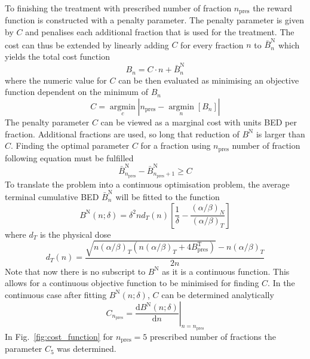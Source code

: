 \documentclass[\relativeRoot/ada.tex]{subfiles}
\begin{document}
To finishing the treatment with prescribed number of fraction $n_{\text{pres}}$ the reward function is constructed with a penalty parameter. The penalty parameter is given by $C$ and penalises each additional fraction  that is used for the treatment. The cost can thus be extended by linearly adding $C$ for every fraction $n$ to $\bar{B}^{\text{N}}_n$ which yields the total cost function
\begin{equation*}
    B_n = C \cdot n + \bar{B}^{\text{N}}_n
\end{equation*}
where the numeric value for $C$ can be then evaluated as minimising an objective function dependent on the minimum of $B_n$
\begin{equation*}
    C = \underset{c}{\operatorname{argmin}}\left| n_{\text{pres}} - \underset{n}{\operatorname{argmin}} \left[B_n \right] \right|
\end{equation*}
The penalty parameter $C$ can be viewed as a marginal cost with units BED per fraction. Additional fractions are used, so long that reduction of $B^{\text{N}}$ is larger than $C$. Finding the optimal parameter $C$ for a fraction using $n_{\text{pres}}$ number of fraction following equation must be fulfilled
\begin{equation*}
    \bar{B}^{\text{N}}_{n_{\text{pres}}} - \bar{B}^{\text{N}}_{n_{\text{pres}}+1} \geq C
\end{equation*}
To translate the problem into a continuous optimisation problem, the average terminal cumulative BED $\bar{B}^{\text{N}}_n$ will be fitted to the function
\begin{equation}
    B^{\text{N}}(n; \delta) = \delta^2 n d_T(n) \left[ \frac{1}{\delta} - \frac{(\alpha / \beta) _N}{(\alpha / \beta)_T}\right]
\end{equation}
where $d_T$ is the physical dose
\begin{equation*}
    d_T(n) = \frac{\sqrt{n (\alpha / \beta)_T (n (\alpha / \beta)_T + 4 B_{\text{pres}}^{\text{T}})} - n (\alpha / \beta)_T}{2n}
\end{equation*}
Note that now there is no subscript to $B^{\text{N}}$ as it is a continuous function. This allows for a continuous objective function to be minimised for finding $C$. In the continuous case after fitting $B^{\text{N}}(n; \delta)$, $C$ can be determined analytically
\begin{equation*}
    C_{n_{\text{pres}}} = \left.\frac{\text{d} B^{\text{N}}(n; \delta)}{\text{d} n}\right|_{n=n_{\text{pres}}}
\end{equation*}
In Fig.~\ref{fig:cost_function} for $n_{\text{pres}}=5$ prescribed number of fractions the parameter $C_5$ was determined.
\end{document}
